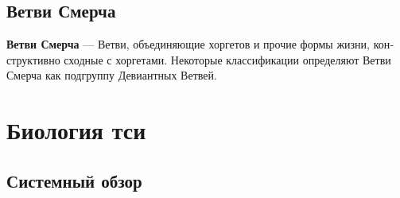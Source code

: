\documentclass[a4paper,12pt,fleqn]{book}\usepackage{cooltooltips}\usepackage{polyglossia}\setdefaultlanguage[babelshorthands=true]{russian}\setotherlanguage{english}\defaultfontfeatures{Ligatures=TeX,Mapping=tex-text} \usepackage{xcolor}\definecolor{lightgray}{HTML}{bbbbbb}\color{lightgray}\newcommand{\ml}[3]{\textenglish{\textcolor{black}{#3}}}
\newcommand{\theterm}[3]{\textbf{\hypertarget{#1}{#2}} --- #3}
\begin{document}
\section{Ветви Смерча}

\theterm{jorget} %
{Ветви Смерча}
{Ветви, объединяющие хоргетов и прочие формы жизни, конструктивно сходные с хоргетами.
Некоторые классификации определяют Ветви Смерча как подгруппу Девиантных Ветвей.}

\chapter{Биология тси}

\section{Системный обзор}
\end{document}
